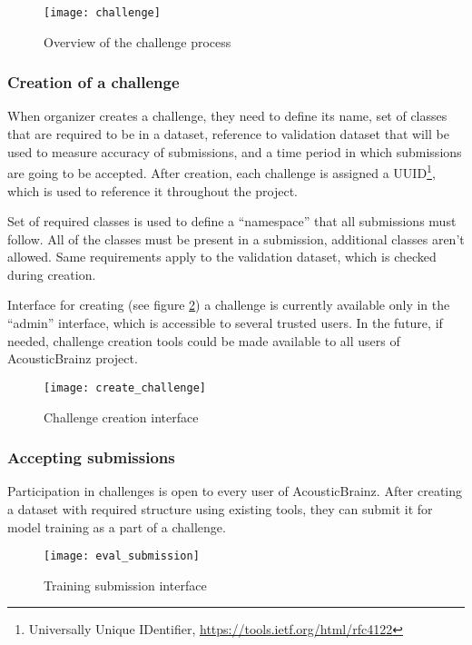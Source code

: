 \begin{figure}[h]
  \centering
  \texttt{[image: challenge]}
    \caption{Overview of the challenge process}
    \label{fig:challenge}
\end{figure}

\subsubsection{Creation of a challenge}

When organizer creates a challenge, they need to define its name, set of classes that are required to be in a dataset, reference to validation dataset that will be used to measure accuracy of submissions, and a time period in which submissions are going to be accepted. After creation, each challenge is assigned a UUID\footnote{Universally Unique IDentifier, \url{https://tools.ietf.org/html/rfc4122}}, which is used to reference it throughout the project.

Set of required classes is used to define a ``namespace'' that all submissions must follow. All of the classes must be present in a submission, additional classes aren't allowed. Same requirements apply to the validation dataset, which is checked during creation.

Interface for creating (see figure \ref{fig:create_challenge}) a challenge is currently available only in the ``admin'' interface, which is accessible to several trusted users. In the future, if needed, challenge creation tools could be made available to all users of AcousticBrainz project.

\begin{figure}[h]
  \centering
  \texttt{[image: create\_challenge]}
    \caption{Challenge creation interface}
    \label{fig:create_challenge}
\end{figure}

\subsubsection{Accepting submissions}

Participation in challenges is open to every user of AcousticBrainz. After creating a dataset with required structure using existing tools, they can submit it for model training as a part of a challenge.

\begin{figure}[h]
  \centering
  \texttt{[image: eval\_submission]}
    \caption{Training submission interface}
    \label{fig:eval_submission}
\end{figure}


